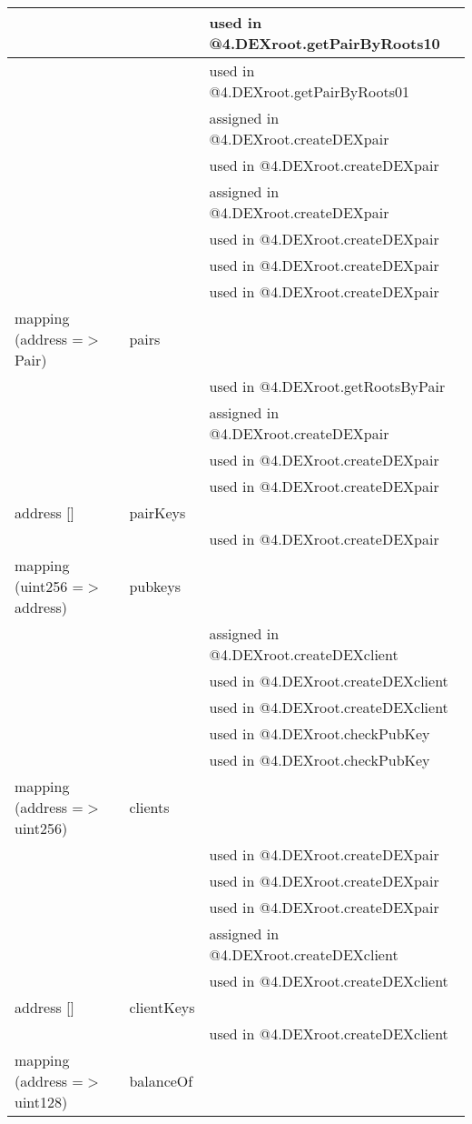\begin{tabular}{|l|l|p{5cm}|}
 & & used in @4.DEXroot.getPairByRoots10\\\hline
 & & used in @4.DEXroot.getPairByRoots01\\\hline
 & & assigned in @4.DEXroot.createDEXpair\\\hline
 & & used in @4.DEXroot.createDEXpair\\\hline
 & & assigned in @4.DEXroot.createDEXpair\\\hline
 & & used in @4.DEXroot.createDEXpair\\\hline
 & & used in @4.DEXroot.createDEXpair\\\hline
 & & used in @4.DEXroot.createDEXpair\\\hline
mapping (address =$>$ Pair) & pairs &  \\\hline
 & & used in @4.DEXroot.getRootsByPair\\\hline
 & & assigned in @4.DEXroot.createDEXpair\\\hline
 & & used in @4.DEXroot.createDEXpair\\\hline
 & & used in @4.DEXroot.createDEXpair\\\hline
address [] & pairKeys &  \\\hline
 & & used in @4.DEXroot.createDEXpair\\\hline
mapping (uint256 =$>$ address) & pubkeys &  \\\hline
 & & assigned in @4.DEXroot.createDEXclient\\\hline
 & & used in @4.DEXroot.createDEXclient\\\hline
 & & used in @4.DEXroot.createDEXclient\\\hline
 & & used in @4.DEXroot.checkPubKey\\\hline
 & & used in @4.DEXroot.checkPubKey\\\hline
mapping (address =$>$ uint256) & clients &  \\\hline
 & & used in @4.DEXroot.createDEXpair\\\hline
 & & used in @4.DEXroot.createDEXpair\\\hline
 & & used in @4.DEXroot.createDEXpair\\\hline
 & & assigned in @4.DEXroot.createDEXclient\\\hline
 & & used in @4.DEXroot.createDEXclient\\\hline
address [] & clientKeys &  \\\hline
 & & used in @4.DEXroot.createDEXclient\\\hline
mapping (address =$>$ uint128) & balanceOf &  \\\hline

\end{tabular}

